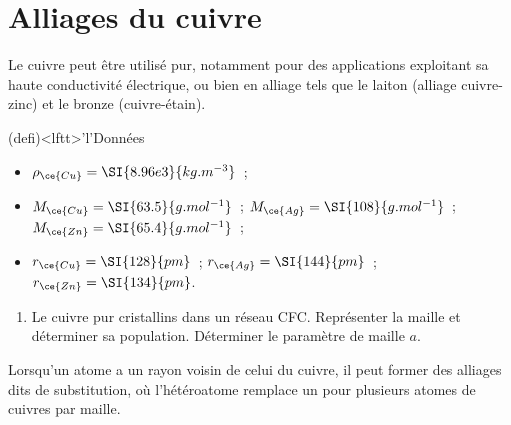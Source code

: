 \documentclass[a4paper, 10pt, final, garamond]{book}
\begin{document}
\section{Alliages du cuivre}
Le cuivre peut être utilisé pur, notamment pour des applications exploitant sa
haute conductivité électrique, ou bien en alliage tels que le laiton (alliage
cuivre-zinc) et le bronze (cuivre-étain).
\begin{tcn}(defi)<lftt>'l'{Données}
	\begin{itemize}[]
		\item $\rho_{\ce{Cu}} = \SI{8.96e3}{kg.m ^{-3}}$~;
		\item $M_{\ce{Cu}} = \SI{63.5}{g.mol^{-1}}$~; $M_{\ce{Ag}} =
			      \SI{108}{g.mol^{-1}}$~; $M_{\ce{Zn}} = \SI{65.4}{g.mol^{-1}}$~;
		\item $r_{\ce{Cu}} = \SI{128}{pm}$~; $r_{\ce{Ag}} = \SI{144}{pm}$~;
		      $r_{\ce{Zn}} = \SI{134}{pm}$.
	\end{itemize}
\end{tcn}
\begin{enumerate}
	\item Le cuivre pur cristallins dans un réseau CFC. Représenter la maille et
	      déterminer sa population. Déterminer le paramètre de maille $a$.
\end{enumerate}
Lorsqu'un atome a un rayon voisin de celui du cuivre, il peut former des
alliages dits de substitution, où l'hétéroatome remplace un pour plusieurs
atomes de cuivres par maille.
\end{document}
